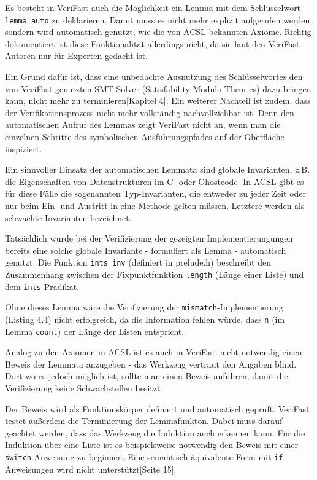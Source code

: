 Es besteht in VeriFast auch die Möglichkeit ein Lemma mit dem Schlüsselwort \lstinline{lemma_auto} zu deklarieren.
Damit muss es nicht mehr explizit aufgerufen werden, sondern wird automatisch genutzt, wie die von 
ACSL bekannten Axiome. Richtig dokumentiert ist diese Funktionalität allerdings nicht, da sie laut den VeriFast-Autoren
nur für Experten gedacht ist.

Ein Grund dafür ist, dass eine unbedachte Ausnutzung des Schlüsselwortes den von VeriFast genutzten 
SMT-Solver (Satisfability Modulo Theories) dazu bringen kann, nicht mehr zu terminieren\cite{jacobs-2010}[Kapitel 4]. Ein
weiterer Nachteil ist zudem, dass der Verifikationsprozess nicht mehr vollständig nachvollziehbar ist.
Denn den automatischen Aufruf des Lemmas zeigt VeriFast nicht an, wenn man die einzelnen
Schritte des symbolischen Ausführungspfades auf der Oberfläche inspiziert.

Ein sinnvoller Einsatz der automatischen Lemmata sind globale Invarianten, z.B. die Eigenschaften von Datenstrukturen
im C- oder Ghostcode. In ACSL gibt es für diese Fälle die sogenannten Typ-Invarianten, die entweder zu jeder Zeit oder
nur beim Ein- und Austritt in eine Methode gelten müssen. Letztere werden als schwachte Invarianten bezeichnet.

Tatsächlich wurde bei der Verifizierung der gezeigten Implementierungungen bereits eine solche
globale Invariante - formuliert als Lemma - automatisch genutzt. Die Funktion \lstinline{ints_inv}
(definiert in prelude.h) beschreibt den Zusammenhang zwischen der Fixpunktfunktion \texttt{length}
(Länge einer Liste) und dem \lstinline{ints}-Prädikat.



Ohne dieses Lemma wäre die Verifizierung der \lstinline{mismatch}-Implementierung (Listing 4.4)
nicht erfolgreich, da die Information fehlen würde, dass \lstinline{n} (im Lemma \lstinline{count})
der Länge der Listen entspricht.

Analog zu den Axiomen in ACSL ist es auch in VeriFast nicht notwendig einen Beweis der Lemmata anzugeben -
das Werkzeug vertraut den Angaben blind. Dort wo es jedoch möglich ist, sollte man einen Beweis anführen,
damit die Verifizierung keine Schwachstellen besitzt.

Der Beweis wird als Funktionskörper definiert und automatisch geprüft. VeriFast testet außerdem die
Terminierung der Lemmafunkton. 
Dabei muss darauf geachtet werden, dass das Werkzeug die Induktion auch erkennen kann. Für die Induktion 
über eine Liste ist es beispielsweise notwendig den Beweis mit einer 
\texttt{switch}-Anweisung zu beginnen. Eine semantisch äquivalente Form mit \texttt{if}-Anweisungen wird 
nicht unterstützt\cite{jacobs-tutorial}[Seite 15].


